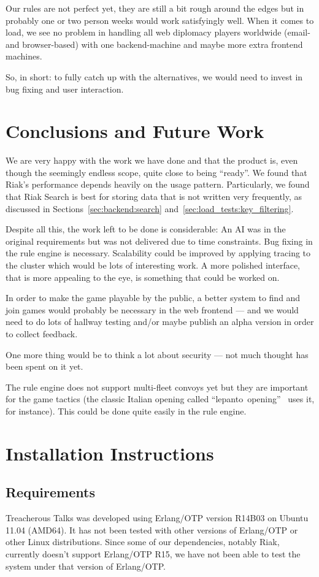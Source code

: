 \documentclass[11pt,a4paper]{report}
\begin{document}
Our rules are not perfect yet, they are still a bit rough around the edges but
in probably one or two person weeks would work satisfyingly well.
When it comes to load, we see no problem in handling all web diplomacy
players worldwide (email- and browser-based) with one backend-machine and maybe
more extra frontend machines.

So, in short: to fully catch up with the alternatives, we would need to invest
in bug fixing and user interaction.

\chapter{Conclusions and Future Work}
We are very happy with the work we have done and that the product is, even
though the seemingly endless scope, quite close to being ``ready''.
We found that Riak's performance depends heavily on the usage pattern.
Particularly, we found that Riak Search is best for storing data that is
not written very frequently, as discussed in Sections~\ref{sec:backend:search}
and~\ref{sec:load_tests:key_filtering}.

Despite all this, the work left to be done is considerable:
An AI was in the original requirements but was not delivered due to time
constraints.
Bug fixing in the rule engine is necessary. Scalability could be improved by
applying tracing to the cluster which would be lots of interesting work. A more
polished interface, that is more appealing to the eye, is something that could
be worked on.

In order to make the game playable by the public, a better system to find and
join games would probably be necessary in the web frontend --- and we would
need to do lots of hallway testing and/or maybe publish an alpha version in
order to collect feedback.

One more thing would be to think a lot about security --- not much thought has
been spent on it yet.

The rule engine does not support multi-fleet convoys yet but they are important
for the game tactics (the classic Italian opening called
``lepanto~opening''~\cite{lepanto} uses it, for instance).
This could be done quite easily in the rule engine.

\appendix
\chapter{Installation Instructions}
\section{Requirements}
Treacherous Talks was developed using Erlang/OTP version R14B03 on Ubuntu 11.04
(AMD64). It has not been tested with other versions of Erlang/OTP or other Linux
distributions. Since some of our dependencies, notably Riak, currently doesn't
support Erlang/OTP R15, we have not been able to test the system under that
version of Erlang/OTP.
\end{document}
